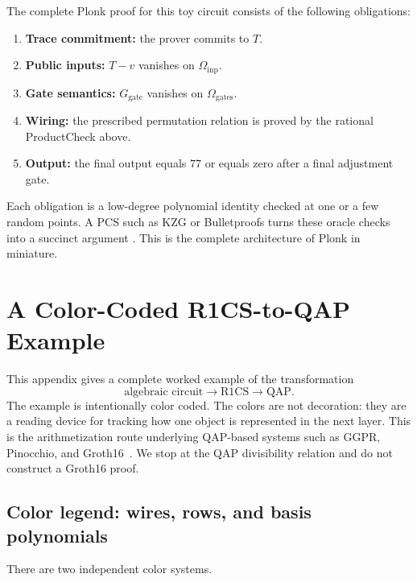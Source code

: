 \documentclass[11pt]{article}
\begin{document}
The complete Plonk proof for this toy circuit consists of the following obligations:
\begin{enumerate}[leftmargin=2em]
    \item \textbf{Trace commitment:} the prover commits to $T$.
    \item \textbf{Public inputs:} $T-v$ vanishes on $\Omega_{\mathrm{inp}}$.
    \item \textbf{Gate semantics:} $G_{\mathrm{gate}}$ vanishes on $\Omega_{\mathrm{gates}}$.
    \item \textbf{Wiring:} the prescribed permutation relation is proved by the rational ProductCheck above.
    \item \textbf{Output:} the final output equals $77$ or equals zero after a final adjustment gate.
\end{enumerate}

Each obligation is a low-degree polynomial identity checked at one or a few random points. A PCS such as KZG or Bulletproofs turns these oracle checks into a succinct argument \cite{KateZaveruchaGoldberg2010,Bulletproofs2018}. This is the complete architecture of Plonk in miniature.


\section{A Color-Coded R1CS-to-QAP Example}
\label{app:r1cs-qap-example}

This appendix gives a complete worked example of the transformation
\[
    \text{algebraic circuit}\longrightarrow \text{R1CS}\longrightarrow \text{QAP}.
\]
The example is intentionally color coded. The colors are not decoration: they are a reading device for tracking how one object is represented in the next layer. This is the arithmetization route underlying QAP-based systems such as GGPR, Pinocchio, and Groth16~\cite{GennaroGentryParnoRaykova2013,ParnoHowellGentryRaykova2013,Groth2016}. We stop at the QAP divisibility relation and do not construct a Groth16 proof.

\subsection{Color legend: wires, rows, and basis polynomials}

There are two independent color systems.
\end{document}
